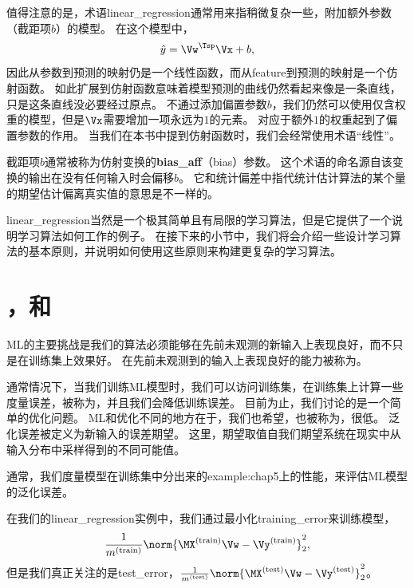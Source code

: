 值得注意的是，术语{\gls{linear_regression}}通常用来指稍微复杂一些，附加额外参数（截距项$b$）的模型。
在这个模型中，
\begin{equation}
    \hat{y} = \Vw^\Tsp \Vx + b,
\end{equation}
因此从参数到预测的映射仍是一个线性函数，而从\gls{feature}到预测的映射是一个仿射函数。
如此扩展到仿射函数意味着模型预测的曲线仍然看起来像是一条直线，只是这条直线没必要经过原点。
不通过添加偏置参数$b$，我们仍然可以使用仅含权重的模型，但是$\Vx$需要增加一项永远为$1$的元素。
对应于额外$1$的权重起到了偏置参数的作用。
当我们在本书中提到仿射函数时，我们会经常使用术语``线性''。


截距项$b$通常被称为仿射变换的\textbf{\gls{bias_aff}}（bias）参数。
这个术语的命名源自该变换的输出在没有任何输入时会偏移$b$。
它和统计偏差中指代统计估计算法的某个量的期望估计偏离真实值的意思是不一样的。

\gls{linear_regression}当然是一个极其简单且有局限的学习算法，但是它提供了一个说明学习算法如何工作的例子。
在接下来的小节中，我们将会介绍一些设计学习算法的基本原则，并说明如何使用这些原则来构建更复杂的学习算法。

\section{，和}
\label{sec:capacity_overfitting_and_underfitting}
\gls{ML}的主要挑战是我们的算法必须能够在先前未观测的新输入上表现良好，而不只是在训练集上效果好。
在先前未观测到的输入上表现良好的能力被称为。

通常情况下，当我们训练\gls{ML}模型时，我们可以访问训练集，在训练集上计算一些度量误差，被称为，并且我们会降低训练误差。
目前为止，我们讨论的是一个简单的优化问题。
\gls{ML}和优化不同的地方在于，我们也希望，也被称为，很低。
泛化误差被定义为新输入的误差期望。
这里，期望取值自我们期望系统在现实中从输入分布中采样得到的不同可能值。

通常，我们度量模型在训练集中分出来的\gls{example:chap5}上的性能，来评估\gls{ML}模型的泛化误差。

在我们的\gls{linear_regression}实例中，我们通过最小化\gls{training_error}来训练模型，
\begin{equation}
    \frac{1}{m^{(\text{train})}} \norm{\MX^{(\text{train})}\Vw - \Vy^{(\text{train})}}_2^2,
\end{equation}
但是我们真正关注的是\gls{test_error}，$\frac{1}{m^{(\text{test})}} \norm{\MX^{(\text{test})}\Vw - \Vy^{(\text{test})}}_2^2$。


